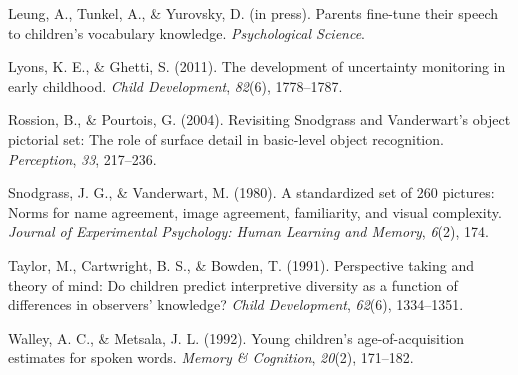 \documentclass[10pt, letterpaper]{article}
\newenvironment{CSLReferences}%
  {}%
  {\par}
\begin{document}
\begin{CSLReferences}
\leavevmode\hypertarget{ref-leung2021}{}%
Leung, A., Tunkel, A., \& Yurovsky, D. (in press). Parents fine-tune
their speech to children's vocabulary knowledge. \emph{Psychological
Science}.

\leavevmode\hypertarget{ref-lyons2011}{}%
Lyons, K. E., \& Ghetti, S. (2011). The development of uncertainty
monitoring in early childhood. \emph{Child Development}, \emph{82}(6),
1778--1787.

\leavevmode\hypertarget{ref-rossion2004}{}%
Rossion, B., \& Pourtois, G. (2004). {Revisiting Snodgrass and
Vanderwart's object pictorial set: The role of surface detail in
basic-level object recognition}. \emph{Perception}, \emph{33}, 217--236.

\leavevmode\hypertarget{ref-snodgrass1980}{}%
Snodgrass, J. G., \& Vanderwart, M. (1980). A standardized set of 260
pictures: Norms for name agreement, image agreement, familiarity, and
visual complexity. \emph{Journal of Experimental Psychology: Human
Learning and Memory}, \emph{6}(2), 174.

\leavevmode\hypertarget{ref-taylor1991}{}%
Taylor, M., Cartwright, B. S., \& Bowden, T. (1991). Perspective taking
and theory of mind: Do children predict interpretive diversity as a
function of differences in observers' knowledge? \emph{Child
Development}, \emph{62}(6), 1334--1351.

\leavevmode\hypertarget{ref-walley1992}{}%
Walley, A. C., \& Metsala, J. L. (1992). Young children's
age-of-acquisition estimates for spoken words. \emph{Memory \&
Cognition}, \emph{20}(2), 171--182.

\end{CSLReferences}


\end{document}
